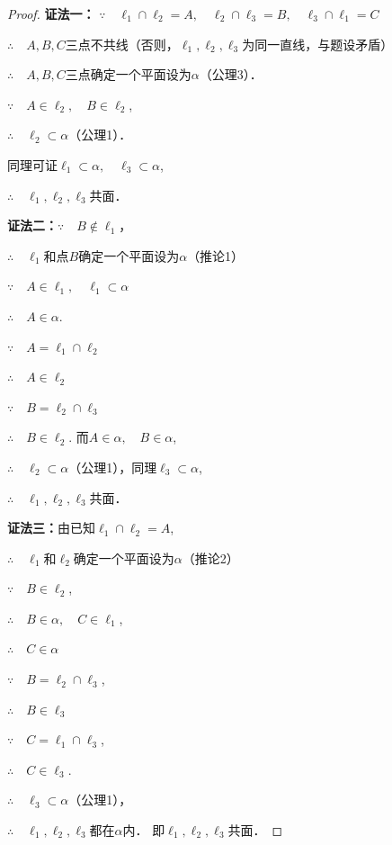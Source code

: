 \begin{proof}
\textbf{证法一：} $\because\quad \ell_1\cap \ell_2=A,\quad  \ell_2\cap \ell_3=B,\quad  \ell_3\cap\ell_1=C$

$\therefore\quad A,B,C$三点不共线（否则，$\ell_1,\ell_2,\ell_3$为同一直线，与题设矛盾）

$\therefore\quad A,B,C$三点确定一个平面设为$\alpha$（公理3）．

$\because\quad A\in \ell_2,\quad  B\in\ell_2$,

$\therefore\quad \ell_2\subset \alpha$（公理1）．

同理可证$\ell_1\subset\alpha,\quad  \ell_3\subset\alpha$,

$\therefore\quad \ell_1,\ell_2,\ell_3$共面．

\textbf{证法二：}$\because\quad B\notin \ell_1$，

$\therefore\quad \ell_1$和点$B$确定一个平面设为$\alpha$（推论1）

$\because\quad A\in \ell_1,\quad  \ell_1\subset\alpha$

$\therefore\quad A\in\alpha$.

$\because\quad A=\ell_1\cap \ell_2$

$\therefore\quad A\in \ell_2$

$\because\quad B=\ell_2\cap \ell_3$

$\therefore\quad B\in \ell_2$. 而$A\in\alpha,\quad  B\in\alpha$,

$\therefore\quad \ell_2\subset\alpha$（公理1），同理$\ell_3\subset\alpha$,

$\therefore\quad \ell_1,\ell_2,\ell_3$共面．

\textbf{证法三：}由已知$\ell_1\cap \ell_2=A$,

$\therefore\quad \ell_1$和$\ell_2$确定一个平面设为$\alpha$（推论2）

$\because\quad B\in \ell_2$,

$\therefore\quad B\in\alpha,\quad  C\in \ell_1$,

$\therefore\quad C\in\alpha$

$\because\quad B=\ell_2\cap \ell_3$,

$\therefore\quad B\in\ell_3$

$\because\quad C=\ell_1\cap \ell_3$,

$\therefore\quad C\in\ell_3$.

$\therefore\quad \ell_3\subset\alpha$（公理1），

$\therefore\quad \ell_1,\ell_2,\ell_3$都在$\alpha$内．
即$\ell_1,\ell_2,\ell_3$共面．
\end{proof}

